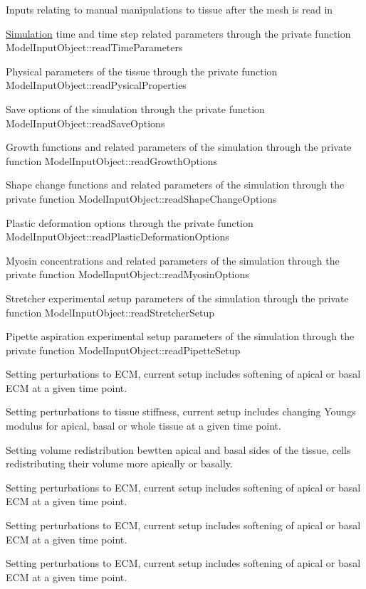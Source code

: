 Inputs relating to manual manipulations to tissue after the mesh is read in

\hyperlink{classSimulation}{Simulation} time and time step related parameters through the private function Model\+Input\+Object\+::read\+Time\+Parameters

Physical parameters of the tissue through the private function Model\+Input\+Object\+::read\+Pysical\+Properties

Save options of the simulation through the private function Model\+Input\+Object\+::read\+Save\+Options

Growth functions and related parameters of the simulation through the private function Model\+Input\+Object\+::read\+Growth\+Options

Shape change functions and related parameters of the simulation through the private function Model\+Input\+Object\+::read\+Shape\+Change\+Options

Plastic deformation options through the private function Model\+Input\+Object\+::read\+Plastic\+Deformation\+Options

Myosin concentrations and related parameters of the simulation through the private function Model\+Input\+Object\+::read\+Myosin\+Options

Stretcher experimental setup parameters of the simulation through the private function Model\+Input\+Object\+::read\+Stretcher\+Setup

Pipette aspiration experimental setup parameters of the simulation through the private function Model\+Input\+Object\+::read\+Pipette\+Setup

Setting perturbations to E\+C\+M, current setup includes softening of apical or basal E\+C\+M at a given time point.

Setting perturbations to tissue stiffness, current setup includes changing Young\textquotesingle{}s modulus for apical, basal or whole tissue at a given time point.

Setting volume redistribution bewtten apical and basal sides of the tissue, cells redistributing their volume more apically or basally.

Setting perturbations to E\+C\+M, current setup includes softening of apical or basal E\+C\+M at a given time point.

Setting perturbations to E\+C\+M, current setup includes softening of apical or basal E\+C\+M at a given time point.

Setting perturbations to E\+C\+M, current setup includes softening of apical or basal E\+C\+M at a given time point.

